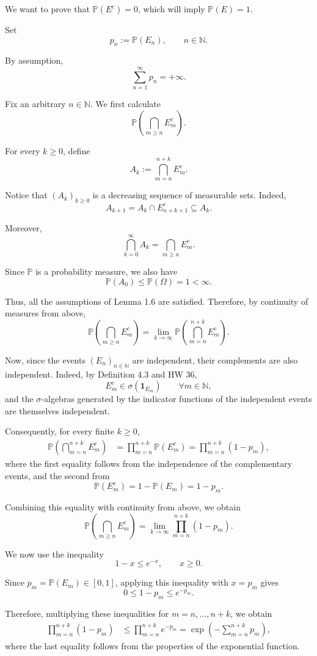 \documentclass[11pt,a4paper]{article}
\begin{document}
We want to prove that $\mathbb P(E^c)=0$, which will imply $\mathbb P(E)=1$.

Set
\[
p_n:=\mathbb P(E_n),
\qquad n\in\mathbb N.
\]

By assumption,
\[
\sum_{n=1}^{\infty}p_n=+\infty.
\]

Fix an arbitrary $n\in\mathbb N$. We first calculate
\[
\mathbb P\left(\bigcap_{m\ge n}E_m^c\right).
\]

For every $k\ge0$, define
\[
A_k:=\bigcap_{m=n}^{n+k}E_m^c.
\]

Notice that $(A_k)_{k\ge0}$ is a decreasing sequence of measurable sets. Indeed,
\[
A_{k+1}
=A_k\cap E_{n+k+1}^c
\subseteq A_k.
\]

Moreover,
\[
\bigcap_{k=0}^{\infty}A_k
=
\bigcap_{m\ge n}E_m^c.
\]

Since $\mathbb P$ is a probability measure, we also have
\[
\mathbb P(A_0)\le\mathbb P(\Omega)=1<\infty.
\]

Thus, all the assumptions of Lemma 1.6 are satisfied. Therefore, by continuity of measures from above,
\[
\mathbb P\left(\bigcap_{m\ge n}E_m^c\right)
=
\lim_{k\to\infty}
\mathbb P\left(\bigcap_{m=n}^{n+k}E_m^c\right).
\]

Now, since the events $(E_n)_{n\in\mathbb N}$ are independent, their complements are also independent. Indeed, by Definition 4.3 and HW 36,
\[
E_m^c\in\sigma(\mathbf 1_{E_m})
\qquad\forall m\in\mathbb N,
\]
and the $\sigma$-algebras generated by the indicator functions of the independent events are themselves independent.

Consequently, for every finite $k\ge0$,
\[
\begin{aligned}
\mathbb P\left(\bigcap_{m=n}^{n+k}E_m^c\right)
&=\prod_{m=n}^{n+k}\mathbb P(E_m^c) =\prod_{m=n}^{n+k}(1-p_m),
\end{aligned}
\]
where the first equality follows from the independence of the complementary events, and the second from
\[
\mathbb P(E_m^c)=1-\mathbb P(E_m)=1-p_m.
\]

Combining this equality with continuity from above, we obtain
\[
\mathbb P\left(\bigcap_{m\ge n}E_m^c\right)
=
\lim_{k\to\infty}
\prod_{m=n}^{n+k}(1-p_m).
\]

We now use the inequality
\[
1-x\le e^{-x},\qquad x\ge0.
\]

Since $p_m=\mathbb P(E_m)\in[0,1]$, applying this inequality with $x=p_m$ gives
\[
0\le1-p_m\le e^{-p_m}.
\]

Therefore, multiplying these inequalities for $m=n,\ldots,n+k$, we obtain
\[
\begin{aligned}
\prod_{m=n}^{n+k}(1-p_m)
&\le\prod_{m=n}^{n+k}e^{-p_m} =\exp\left(-\sum_{m=n}^{n+k}p_m\right),
\end{aligned}
\]
where the last equality follows from the properties of the exponential function.
\end{document}
